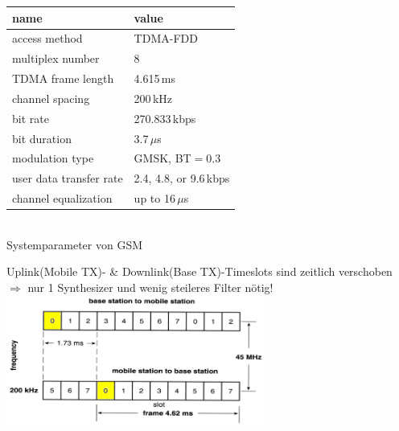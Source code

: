     \begin{minipage}{7.4cm}    
	    \begin{center}
	    \begin{tabular}{|l|l|} \hline
	    name & value \\ \hline \hline
	    access method           & TDMA-FDD \\ \hline
	    multiplex number        & 8 \\ \hline
	    TDMA frame length       & 4.615\,ms \\ \hline
	    channel spacing         & 200\,kHz \\ \hline
	    bit rate                & 270.833\,kbps \\ \hline
	    bit duration            & 3.7\,$\mu$s \\ \hline
	    modulation type         & GMSK, BT$=0.3$ \\ \hline
	    user data transfer rate & 2.4, 4.8, or 9.6\,kbps \\ \hline
	    channel equalization    & up to 16\,$\mu$s \\ \hline
	    \end{tabular} \\
	        Systemparameter von GSM
	    \end{center}
    \end{minipage}
    \begin{minipage}{2cm}        
        \quad
    \end{minipage}
    \begin{minipage}{9cm}    
        \footnotesize
        Uplink(Mobile TX)- \& Downlink(Base TX)-Timeslots sind zeitlich verschoben
        $\Rightarrow$ nur 1 Synthesizer und wenig steileres Filter nötig!
        \normalsize    \\
        \includegraphics[width=8.5cm]{./bilder/systems-gsm-ud-slots.png}
    \end{minipage}

